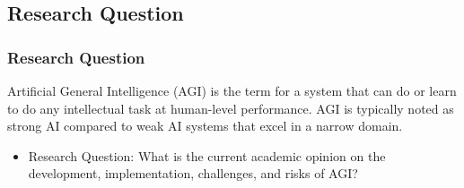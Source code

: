 \documentclass[
	11pt, %
]{beamer}
\begin{document}
\subsection{Research Question}

\begin{frame}
	\frametitle{Research Question}
    

    Artificial General Intelligence (AGI) is the term for a system that can do or learn to do any intellectual task at human-level performance. AGI is typically noted as strong AI compared to weak AI systems that excel in a narrow domain.
       
	\bigskip %

	\begin{itemize}
		\item Research Question: What is the current academic opinion on the development, implementation, challenges, and risks of AGI?
	\end{itemize}
    
\end{frame}

\end{document}
